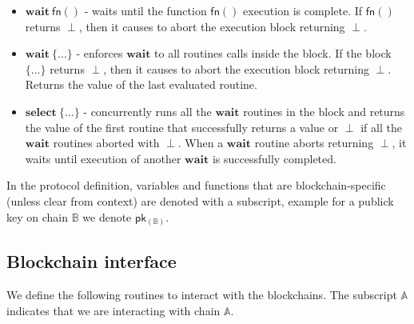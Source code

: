 \documentclass{article}      	%
\begin{document}
\begin{itemize}[nosep, noitemsep]
    \item $\mathbf{wait} \: \mathsf{fn}()$ - waits until the function $\mathsf{fn}()$ execution is complete. If $\mathsf{fn}()$ returns $\perp$, then it causes to abort the execution block returning $\perp$. \\
    \item $\mathbf{wait} \: \{...\}$ - enforces $\mathbf{wait}$ to all routines calls inside the block. If the block $\{...\}$ returns $\perp$, then it causes to abort the execution block returning $\perp$. Returns the value of the last evaluated routine. \\
    \item $\mathbf{select} \: \{...\}$ - concurrently runs all the $\mathbf{wait}$ routines in the block and returns the value of the first routine that successfully returns a value or $\perp$ if all the $\mathbf{wait}$ routines aborted with $\perp$. When a $\mathbf{wait}$ routine aborts returning $\perp$, it waits until execution of another $\mathbf{wait}$ is successfully completed. \\
\end{itemize}

In the protocol definition, variables and functions that are blockchain-specific (unless clear from context) are denoted with a subscript, example for a publick key on chain $\mathbb{B}$ we denote $\mathsf{pk_{(\mathbb{B})}}$. \\

\subsection{Blockchain interface}

We define the following routines to interact with the blockchains. The subscript $\mathbb{A}$ indicates that we are interacting with chain $\mathbb{A}$.
\end{document}
